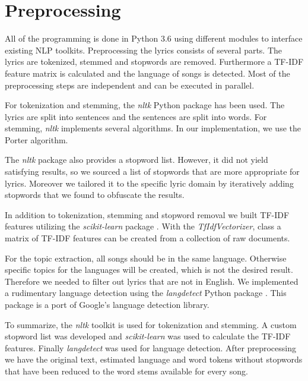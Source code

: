 \documentclass[10pt,a4paper]{article}
\begin{document}
	\section{Preprocessing}	
	\label{sec:preprocessing}
	
	All of the programming is done in Python 3.6 using different modules to interface existing NLP toolkits. Preprocessing the lyrics consists of several parts. The lyrics are tokenized, stemmed and stopwords are removed. Furthermore a TF-IDF feature matrix is calculated and the language of songs is detected. Most of the preprocessing steps are independent and can be executed in parallel. 
	
	For tokenization and stemming, the \textit{nltk} Python package \cite{nltk} has been used. The lyrics are split into sentences and the sentences are split into words. For stemming, \textit{nltk} implements several algorithms. In our implementation, we use the Porter algorithm.  
	
	The \textit{nltk} package also provides a stopword list. However, it did not yield satisfying results, so we sourced a list of stopwords that are more appropriate for lyrics. Moreover we tailored it to the specific lyric domain by iteratively adding stopwords that we found to obfuscate the results.
	
	In addition to tokenization, stemming and stopword removal we built TF-IDF features utilizing the \textit{scikit-learn} package \cite{scikit-learn}. With the \textit{TfIdfVectorizer}, class a matrix of TF-IDF features can be created from a collection of raw documents. 
	
	For the topic extraction, all songs should be in the same language. Otherwise specific topics for the languages will be created, which is not the desired result. Therefore we needed to filter out lyrics that are not in English. We implemented a rudimentary language detection using the \textit{langdetect} Python package \cite{langdetect}. This package is a port of Google's language detection library.
	
	To summarize, the \textit{nltk} toolkit is used for tokenization and stemming. A custom stopword list was developed and \textit{scikit-learn} was used to calculate the TF-IDF features. Finally \textit{langdetect} was used for language detection. After preprocessing we have the original text, estimated language and word tokens without stopwords that have been reduced to the word stems available for every song.
	
\end{document}
